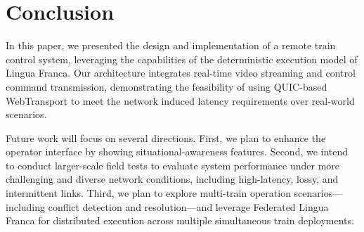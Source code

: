 \section{Conclusion}
\label{sec:conclusion}
    In this paper, we presented the design and implementation of a remote train control system, leveraging the capabilities of the deterministic execution model of Lingua Franca. Our architecture integrates real-time video streaming and control command transmission, demonstrating the feasibility of using QUIC-based WebTransport to meet the network induced latency requirements over real-world scenarios.

    Future work will focus on several directions. First, we plan to enhance the operator interface by showing situational-awareness features. Second, we intend to conduct larger-scale field tests to evaluate system performance under more challenging and diverse network conditions, including high-latency, lossy, and intermittent links. Third, we plan to explore multi-train operation scenarios—including conflict detection and resolution—and leverage Federated Lingua Franca for distributed execution across multiple simultaneous train deployments.